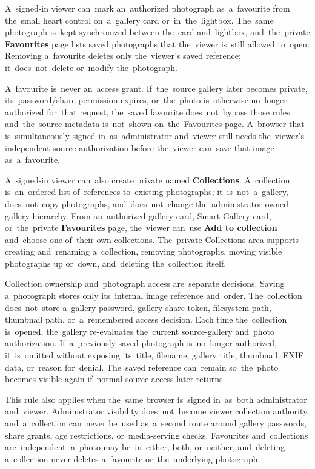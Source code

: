 \documentclass[11pt,a4paper]{article}
\newcommand{\ui}[1]{\textbf{#1}}
\begin{document}
A~signed-in viewer can~mark an~authorized photograph as~a~favourite from
the~small heart control on~a~gallery card or~in~the~lightbox. The~same
photograph is~kept synchronized between the~card and~lightbox, and~the~private
\ui{Favourites} page lists saved photographs that the~viewer is~still allowed
to~open. Removing a~favourite deletes only the~viewer's saved reference;
it~does~not~delete or~modify the~photograph.

A~favourite is~never an~access grant. If~the~source gallery later becomes
private, its~password/share permission expires, or~the~photo is~otherwise
no~longer authorized for~that request, the~saved favourite does~not~bypass those
rules and~the~source metadata is~not~shown on~the~Favourites page. A~browser
that is~simultaneously signed in~as~administrator and~viewer still needs
the~viewer's independent source authorization before the~viewer can~save that
image as~a~favourite.

A~signed-in viewer can~also create private named \ui{Collections}. A~collection
is~an~ordered list of~references to~existing photographs; it~is~not~a~gallery,
does~not~copy photographs, and~does~not~change the~administrator-owned gallery
hierarchy. From an~authorized gallery card, Smart Gallery card, or~the~private
\ui{Favourites} page, the~viewer can~use \ui{Add to collection} and~choose one
of~their own collections. The~private Collections area supports creating
and~renaming a~collection, removing photographs, moving visible photographs up
or~down, and~deleting the~collection itself.

Collection ownership and~photograph access are~separate decisions. Saving
a~photograph stores only its~internal image reference and~order. The~collection
does~not~store a~gallery password, gallery share token, filesystem path,
thumbnail path, or~a~remembered access decision. Each time the~collection
is~opened, the~gallery re-evaluates the~current source-gallery and~photo
authorization. If~a~previously saved photograph is~no~longer authorized,
it~is~omitted without exposing its~title, filename, gallery title, thumbnail,
EXIF data, or~reason for~denial. The~saved reference can~remain so~the~photo
becomes visible again if~normal source access later returns.

This rule also applies when the~same browser is~signed in~as~both administrator
and~viewer. Administrator visibility does~not~become viewer collection
authority, and~a~collection can~never be~used as~a~second route around gallery
passwords, share grants, age restrictions, or~media-serving checks. Favourites
and~collections are~independent: a~photo may be~in~either, both, or~neither,
and~deleting a~collection never deletes a~favourite or~the~underlying
photograph.
\end{document}
